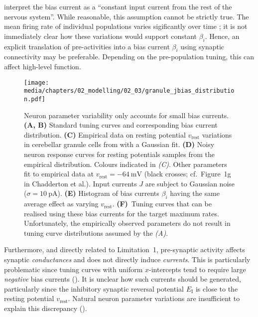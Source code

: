  interpret the bias current as a \enquote{constant input current from the rest of the nervous system}.
While reasonable, this assumption cannot be strictly true.
The mean firing rate of individual populations varies sigificantly over time \citep{okun2012population}; it is not immediately clear how these variations would support constant $\beta_i$.
Hence, an explicit translation of pre-activities into a bias current $\beta_i$ using synaptic connectivity may be preferable.
Depending on the pre-population tuning, this can affect high-level function.


\begin{figure}
	\texttt{[image: media/chapters/02\_modelling/02\_03/granule\_jbias\_distribution.pdf]}%
	{\label{fig:jbias_a}}%
	{\label{fig:jbias_b}}%
	{\label{fig:jbias_c}}%
	{\label{fig:jbias_d}}%
	{\label{fig:jbias_e}}%
	{\label{fig:jbias_f}}
	\caption[Neuron parameter variability only accounts for small bias currents]{Neuron parameter variability only accounts for small bias currents.
	\textbf{(A, B)} Standard \NEF tuning curves and corresponding bias current distribution.
	\textbf{(C)} Empirical data on resting potential $v_\mathrm{rest}$ variations in cerebellar granule cells from \citet[Figure~1b]{chadderton2004integration} with a Gaussian fit.
	\textbf{(D)} Noisy \LIF neuron response curves for resting potentials samples from the empirical distribution. Colours indicated in \emph{(C)}. Other \LIF parameters fit to empirical data at $v_\mathrm{rest} = \SI{-64}{\milli\volt}$ (black crosses; cf.~Figure~1g in Chadderton et al.). Input currents $J$ are subject to Gaussian noise ($\sigma = \SI{10}{\pico\ampere}$). \textbf{(E)} Histogram of bias currents $\beta_i$ having the same average effect as varying $v_\mathrm{rest}$.
	\textbf{(F)}~Tuning curves that can be realised using these bias currents for the target maximum rates.
	Unfortunately, the empirically observed parameters do not result in tuning curve distributions assumed by the \NEF \emph{(A)}.}
	\label{fig:granule_jbias_distribution}
	\vspace*{-0.5em}
\end{figure}

Furthermore, and directly related to Limitation~1, pre-synaptic activity affects synaptic \emph{conductances} and does not directly induce \emph{currents}.
This is particularly problematic since tuning curves with uniform $x$-intercepts tend to require large \emph{negative} bias currents ().
It is unclear how such currents should be generated, particularly since the inhibitory synaptic reversal potential $E_\mathrm{I}$ is close to the resting potential $v_\mathrm{rest}$.
Natural neuron parameter variations are insufficient to explain this discrepancy ().

